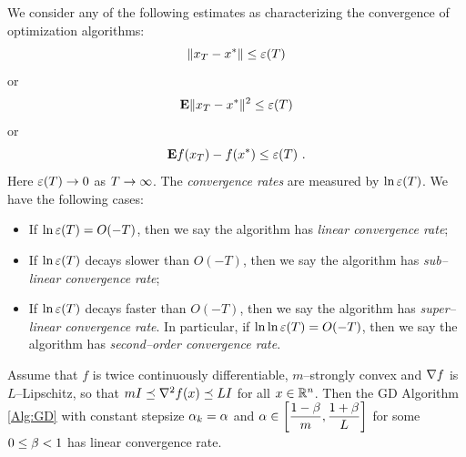 \begin{definition}
We consider any of the following estimates as characterizing the convergence of optimization algorithms:
\begin{equation}\label{Eq:OptimizationConvergence:Type1:x}
\|x_T-x^*\|\leq \varepsilon(T)
\end{equation} 
or 
\begin{equation}\label{Eq:OptimizationConvergence:Type2:Ex}
\mathbf E \|x_T-x^*\|^2\leq \varepsilon(T)
\end{equation} 
or 
\begin{equation}\label{Eq:OptimizationConvergence:Type3:Efx}
\mathbf E f(x_T)-f(x^*)\leq \varepsilon(T) \ .
\end{equation}
Here $\varepsilon(T)\rightarrow 0$ as $T\rightarrow \infty$. The \emph{convergence rates} are measured by $\ln \varepsilon(T)$. We have the following cases:

\begin{itemize}

\item[\emph{(1)}] If $\ln \varepsilon(T)=O(-T)$, then we say the algorithm has \emph{linear convergence rate};

\item[\emph{(2)}] If $\ln \varepsilon(T)$ decays slower than $O(-T)$, then we say the algorithm has \emph{sub--linear convergence rate};

\item[\emph{(3)}] If $\ln \varepsilon(T)$ decays faster than $O(-T)$, then we say the algorithm has \emph{super--linear convergence rate}. In particular, if $\ln\ln \varepsilon(T)=O(-T)$, then we say the algorithm has \emph{second--order convergence rate}.

\end{itemize}
\end{definition}

\begin{theorem}\label{Thm:LinearConvergenceGDStronglyConvex}
Assume that $f$ is twice continuously differentiable, $m$--strongly convex and $\nabla f$ is $L$--Lipschitz,
so that $mI\preceq \nabla^2 f(x) \preceq LI$ for all $x\in \mathbb R^n$. Then the GD Algorithm \ref{Alg:GD}
with constant stepsize $\alpha_k=\alpha$ and $\alpha\in \left[\dfrac{1-\beta}{m}, \dfrac{1+\beta}{L}\right]$ for some $0\leq \beta<1$
has linear convergence rate.
\end{theorem}

